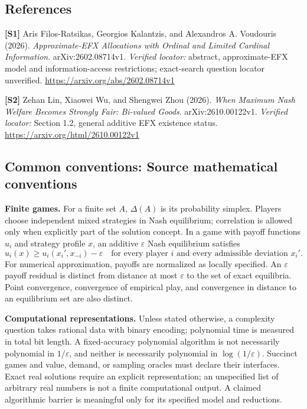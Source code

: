 \documentclass[11pt,a4paper]{article}
\begin{document}
\subsection*{References}
\begingroup\footnotesize\raggedright
\textbf{[S1]} Aris Filos-Ratsikas, Georgios Kalantzis, and Alexandros A. Voudouris (2026). \emph{Approximate-EFX Allocations with Ordinal and Limited Cardinal Information}. arXiv:2602.08714v1. \textit{Verified locator:} abstract, approximate-EFX model and information-access restrictions; exact-search question locator unverified. \url{https://arxiv.org/abs/2602.08714v1}
\par\textbf{[S2]} Zehan Lin, Xiaowei Wu, and Shengwei Zhou (2026). \emph{When Maximum Nash Welfare Becomes Strongly Fair: Bi-valued Goods}. arXiv:2610.00122v1. \textit{Verified locator:} Section 1.2, general additive EFX existence status. \url{https://arxiv.org/html/2610.00122v1}
\par\endgroup

\subsection*{Common conventions: Source mathematical conventions}

\textbf{Finite games.} For a finite set $A$, $\Delta(A)$ is its probability
simplex. Players choose independent mixed strategies in Nash equilibrium;
correlation is allowed only when explicitly part of the solution concept.
In a game with payoff functions $u_i$ and strategy profile $x$, an additive
$\varepsilon$ Nash equilibrium satisfies
\[
 u_i(x)\geq u_i(x_i',x_{-i})-\varepsilon
 \quad\text{for every player $i$ and every admissible deviation $x_i'$}.
\]
For numerical approximation, payoffs are normalized as locally specified.
An $\varepsilon$ payoff residual is distinct from distance at most
$\varepsilon$ to the set of exact equilibria. Point convergence, convergence
of empirical play, and convergence in distance to an equilibrium set are
also distinct.

\textbf{Computational representations.} Unless stated otherwise, a complexity
question takes rational data with binary encoding; polynomial time is measured
in total bit length. A fixed-accuracy polynomial algorithm is not necessarily
polynomial in $1/\varepsilon$, and neither is necessarily polynomial in
$\log(1/\varepsilon)$. Succinct games and value, demand, or sampling oracles
must declare their interfaces. Exact real solutions require an explicit
representation; an unspecified list of arbitrary real numbers is not a
finite computational output. A claimed algorithmic barrier is meaningful
only for its specified model and reductions.
\end{document}

